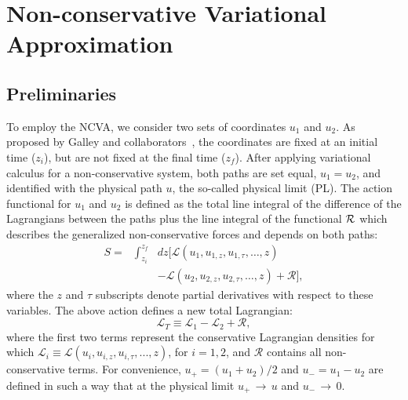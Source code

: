 \documentclass[aps,floatfix,showpacs,preprintnumbers,twocolumn,nofootinbib]{revtex4}
\begin{document}
\section{Non-conservative Variational Approximation
\label{section:TweezeNCVA}}
\subsection{Preliminaries
\label{secNCVA:prelim}}
To employ the NCVA, we consider two sets of coordinates $u_1$ and $u_2$.  As proposed by Galley and collaborators~\cite{Galley,Galley:14}, the coordinates are fixed at an initial time ($z_i$), but are not fixed at the final time ($z_f$).  After applying variational calculus for a non-conservative system, both paths are set equal, $u_1= u_2$, and identified with the physical path $u$, the so-called physical limit (PL).  The action functional for $u_1$ and $u_2$ is defined as the total line integral of the difference of the Lagrangians between the  paths plus the line integral of the functional ${\cal R}$ which describes the generalized non-conservative forces and depends on both paths:
%
\begin{eqnarray}
S =&  \int_{z_i}^{z_f}  & dz [\mathcal{L} (u_1, u_{1,z}, u_{1,\tau}, \ldots,z)  \\ \nonumber
&& - \mathcal{L}(u_2, u_{2,z}, u_{2,\tau}, \ldots,z) + \mathcal{R} ],
\end{eqnarray}
%
where the $z$ and $\tau$ subscripts denote partial derivatives
with respect to these variables.
%
The above action defines a new total Lagrangian:
%
\begin{equation}
\mathcal{L}_T \equiv  \mathcal{L}_1 - \mathcal{L}_2  + \mathcal{R},
\label{eq:action}
\end{equation}
%
where the first two terms represent the conservative Lagrangian densities for which $\mathcal{L}_i \equiv \mathcal{L}(u_i, u_{i,z}, u_{i,\tau}, ...,z)$, for $i=1,2$, and $\mathcal{R}$ contains all non-conservative terms.
%
For convenience, $u_+ = (u_1 + u_2)/2$ and $u_- = u_1 - u_2$ are defined in such a way that at the physical limit $u_+ \,  \rightarrow \, u$ and $u_- \, \rightarrow \, 0$.  
\end{document}
